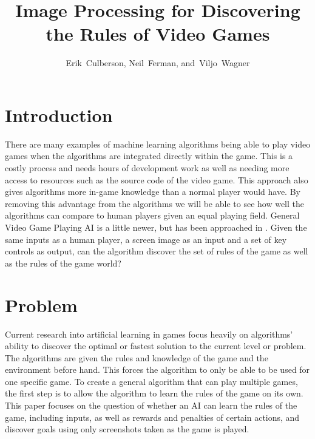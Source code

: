 \documentclass[12pt,journal,compsoc]{IEEEtran}
\begin{document}
\title{Image Processing for Discovering\\ the Rules of Video Games}

\author{Erik~Culberson,
        Neil~Ferman,
      and~Viljo~Wagner}

\maketitle

\section{Introduction}
There are many examples of machine learning algorithms being able to play video games when the algorithms are integrated directly within the game. This is a costly process and needs hours of development work as well as needing more access to resources such as the source code of the video game. This approach also gives algorithms more in-game knowledge than a normal player would have. By removing this advantage from the algorithms we will be able to see how well the algorithms can compare to human players given an equal playing field. General Video Game Playing AI is a little newer, but has been approached in \cite{2}. Given the same inputs as a human player, a screen image as an input and a set of key controls as output, can the algorithm discover the set of rules of the game as well as the rules of the game world?

\section{Problem}
Current research into artificial learning in games focus heavily on algorithms' ability to discover the optimal or fastest solution to the current level or problem. The algorithms are given the rules and knowledge of the game and the environment before hand. This forces the algorithm to only be able to be used for one specific game. To create a general algorithm that can play multiple games, the first step is to allow the algorithm to learn the rules of the game on its own. This paper focuses on the question of whether an AI can learn the rules of the game, including inputs, as well as rewards and penalties of certain actions, and discover goals using only screenshots taken as the game is played.
\end{document}
